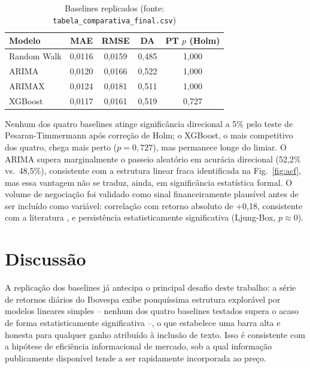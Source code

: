 \documentclass[conference]{IEEEtran}
\begin{document}
\begin{table}[htbp]
\caption{Baselines replicados (fonte: \texttt{tabela\_comparativa\_final.csv})}
\begin{center}
\begin{tabular}{lcccc}
\toprule
\textbf{Modelo} & \textbf{MAE} & \textbf{RMSE} & \textbf{DA} & \textbf{PT $p$ (Holm)} \\
\midrule
Random Walk & 0,0116 & 0,0159 & 0,485 & 1,000 \\
ARIMA       & 0,0120 & 0,0166 & 0,522 & 1,000 \\
ARIMAX      & 0,0124 & 0,0181 & 0,511 & 1,000 \\
XGBoost     & 0,0117 & 0,0161 & 0,519 & 0,727 \\
\bottomrule
\end{tabular}
\label{tab:baselines}
\end{center}
\end{table}

Nenhum dos quatro baselines atinge signific\^ancia direcional a 5\% pelo teste de Pesaran-Timmermann \cite{pesaran1992} ap\'os corre\c{c}\~ao de Holm; o XGBoost, o mais competitivo dos quatro, chega mais perto ($p=0{,}727$), mas permanece longe do limiar. O ARIMA supera marginalmente o passeio aleat\'orio em acur\'acia direcional (52,2\% vs.\ 48,5\%), consistente com a estrutura linear fraca identificada na Fig.~\ref{fig:acf}, mas essa vantagem n\~ao se traduz, ainda, em signific\^ancia estat\'istica formal. O volume de negocia\c{c}\~ao foi validado como sinal financeiramente plaus\'ivel antes de ser inclu\'ido como vari\'avel: correla\c{c}\~ao com retorno absoluto de +0,18, consistente com a literatura \cite{karpoff1987}, e persist\^encia estatisticamente significativa (Ljung-Box, $p\approx0$).

\section{Discuss\~ao}

A replica\c{c}\~ao dos baselines j\'a antecipa o principal desafio deste trabalho: a s\'erie de retornos di\'arios do Ibovespa exibe pouqu\'issima estrutura explor\'avel por modelos lineares simples -- nenhum dos quatro baselines testados supera o acaso de forma estatisticamente significativa --, o que estabelece uma barra alta e honesta para qualquer ganho atribu\'ido \`a inclus\~ao de texto. Isso \'e consistente com a hip\'otese de efici\^encia informacional de mercado, sob a qual informa\c{c}\~ao publicamente dispon\'ivel tende a ser rapidamente incorporada ao pre\c{c}o.
\end{document}
